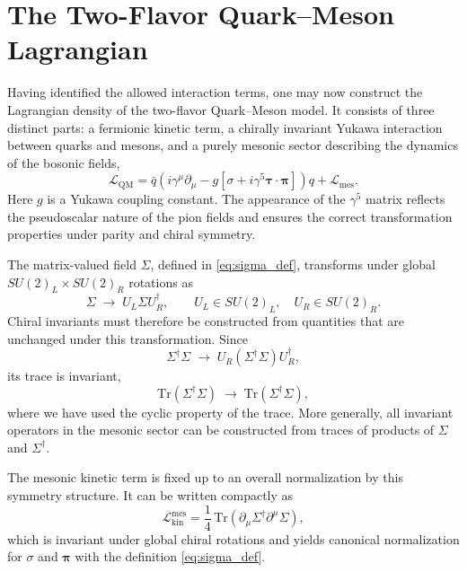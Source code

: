 \section{The Two-Flavor Quark--Meson Lagrangian}
Having identified the allowed interaction terms, one may now
construct the Lagrangian density of the two-flavor Quark--Meson model.
It consists of three distinct parts: a fermionic kinetic term, a
chirally invariant Yukawa interaction between quarks and mesons, and
a purely mesonic sector describing the dynamics of the bosonic fields,
\begin{equation}
\mathcal{L}_{\mathrm{QM}} =
\bar{q}\left(i \gamma^\mu \partial_\mu
- g \left[\sigma + i \gamma^5 \boldsymbol{\tau}\cdot\boldsymbol{\pi}
\right]\right) q
+ \mathcal{L}_{\mathrm{mes}} .
\end{equation}
Here $g$ is a Yukawa coupling constant. The appearance of the
$\gamma^5$ matrix reflects the pseudoscalar nature of the pion fields
and ensures the correct transformation properties under parity and
chiral symmetry.

The matrix-valued field $\Sigma$, defined in \eqref{eq:sigma_def},
transforms under global $SU(2)_L \times SU(2)_R$ rotations as
\begin{equation}
\Sigma \;\longrightarrow\; U_L \Sigma U_R^\dagger ,
\qquad
U_L \in SU(2)_L, \quad U_R \in SU(2)_R .
\end{equation}
Chiral invariants must therefore be constructed from quantities that
are unchanged under this transformation. Since
\begin{equation}
\Sigma^\dagger \Sigma
\;\longrightarrow\;
U_R (\Sigma^\dagger \Sigma) U_R^\dagger ,
\end{equation}
its trace is invariant,
\begin{equation}
\mathrm{Tr}(\Sigma^\dagger \Sigma)
\;\longrightarrow\;
\mathrm{Tr}(\Sigma^\dagger \Sigma),
\end{equation}
where we have used the cyclic property of the trace.
More generally, all invariant operators in the mesonic sector can be
constructed from traces of products of $\Sigma$ and $\Sigma^\dagger$.

The mesonic kinetic term is fixed up to an overall normalization by 
this symmetry structure. It can be written compactly as
\begin{equation}
\mathcal{L}_{\mathrm{kin}}^{\mathrm{mes}}
=
\frac{1}{4}\,\mathrm{Tr}\!\left(
\partial_\mu \Sigma^\dagger \partial^\mu \Sigma
\right),
\end{equation}
which is invariant under global chiral rotations and yields canonical
normalization for $\sigma$ and $\boldsymbol{\pi}$ with the definition
\eqref{eq:sigma_def}.

